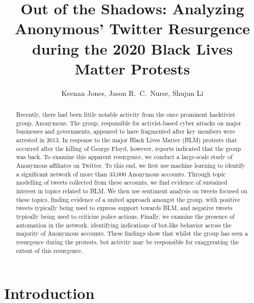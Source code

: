 \documentclass[letterpaper]{article}
\title{Out of the Shadows: Analyzing Anonymous' Twitter Resurgence during the 2020 Black Lives Matter Protests}
\author{Keenan Jones, Jason R.~C.~Nurse, Shujun Li\\}
\begin{document}
 

\maketitle 

\begin{abstract} 
Recently, there had been little notable activity from the once prominent hacktivist group, Anonymous. The group, responsible for activist-based cyber attacks on major businesses and governments, appeared to have fragmented after key members were arrested in 2013. In response to the major Black Lives Matter (BLM) protests that occurred after the killing of George Floyd, however, reports indicated that the group was back. To examine this apparent resurgence, we conduct a large-scale study of Anonymous affiliates on Twitter. To this end, we first use machine learning to identify a significant network of more than 33,000 Anonymous accounts. Through topic modelling of tweets collected from these accounts, we find evidence of sustained interest in topics related to BLM. We then use sentiment analysis on tweets focused on these topics, finding evidence of a united approach amongst the group, with positive tweets typically being used to express support towards BLM, and negative tweets typically being used to criticize police actions. Finally, we examine the presence of automation in the network, identifying indications of bot-like behavior across the majority of Anonymous accounts. These findings show that whilst the group has seen a resurgence during the protests, bot activity may be responsible for exaggerating the extent of this resurgence.
\end{abstract}

\section{Introduction}
\end{document}
